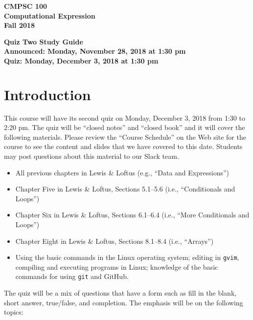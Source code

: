 \documentclass[11pt]{article}
\newcommand{\assignmentduedate}{December 3}
\newcommand{\assignmentassignedate}{November 28}
\newcommand{\assignmentnumber}{Two}
\newcommand{\labyear}{2018}
\newcommand{\assignedday}{Monday}
\newcommand{\dueday}{Monday}
\newcommand{\labtime}{1:30 pm}
\newcommand{\assigneddate}{Announced: \assignedday, \assignmentassignedate, \labyear{} at \labtime{}}
\newcommand{\duedate}{Quiz: \dueday, \assignmentduedate, \labyear{} at \labtime{}}
\newcommand{\guidetitle}[1]
{
  \begin{center}
    \begin{center}
      \bf
      CMPSC 100\\Computational Expression\\
      Fall 2018\\
      \medskip
    \end{center}
    \bf
    #1
  \end{center}
}
\begin{document}
\thispagestyle{empty}

\guidetitle{Quiz \assignmentnumber{} Study Guide \\ \assigneddate{} \\ \duedate{}}

\section*{Introduction}

This course will have its second quiz on Monday, December 3, 2018 from 1:30 to
2:20 pm. The quiz will be ``closed notes'' and ``closed book'' and it will cover
the following materials. Please review the ``Course Schedule'' on the Web site
for the course to see the content and slides that we have covered to this date.
Students may post questions about this material to our Slack team.

\begin{itemize}

  \itemsep -.01in

  \item All previous chapters in Lewis \& Loftus (e.g., ``Data and Expressions'')

  \item Chapter Five in Lewis \& Loftus, Sections 5.1--5.6 (i.e., ``Conditionals and Loops'')

  \item Chapter Six in Lewis \& Loftus, Sections 6.1--6.4 (i.e., ``More Conditionals and Loops'')

  \item Chapter Eight in Lewis \& Loftus, Sections 8.1--8.4 (i.e., ``Arrays'')



  \item Using the basic commands in the Linux operating system; editing in {\tt gvim}, compiling and executing
    programs in Linux; knowledge of the basic commands for using {\tt git} and GitHub.

\end{itemize}

\vspace*{-.05in}
\noindent The quiz will be a mix of questions that have a form such as fill in the blank, short answer, true/false, and
completion.  The emphasis will be on the following topics:
\end{document}
